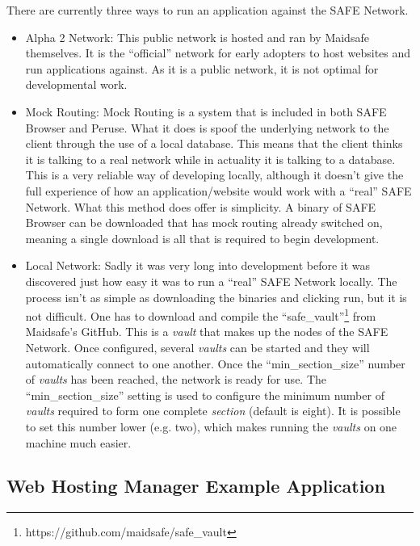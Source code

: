 There are currently three ways to run an application against the SAFE Network.
\begin{itemize}
	\item Alpha 2 Network: This public network is hosted and ran by Maidsafe themselves. It is the ``official'' network for early adopters to host websites and run applications against. As it is a public network, it is not optimal for developmental work.
	\item Mock Routing: Mock Routing is a system that is included in both SAFE Browser and Peruse. What it does is spoof the underlying network to the client through the use of a local database. This means that the client thinks it is talking to a real network while in actuality it is talking to a database. This is a very reliable way of developing locally, although it doesn't give the full experience of how an application/website would work with a ``real'' SAFE Network. What this method does offer is simplicity. A binary of SAFE Browser can be downloaded that has mock routing already switched on, meaning a single download is all that is required to begin development.
	\item Local Network: Sadly it was very long into development before it was discovered just how easy it was to run a ``real'' SAFE Network locally. The process isn't as simple as downloading the binaries and clicking run, but it is not difficult. One has to download and compile the ``safe\_vault''\footnote{https://github.com/maidsafe/safe\_vault} from Maidsafe's GitHub. This is a \textit{vault} that makes up the nodes of the SAFE Network. Once configured, several \textit{vaults} can be started and they will automatically connect to one another. Once the ``min\_section\_size'' number of \textit{vaults} has been reached, the network is ready for use. The ``min\_section\_size'' setting is used to configure the minimum number of \textit{vaults} required to form one complete \textit{section} (default is eight). It is possible to set this number lower (e.g. two), which makes running the \textit{vaults} on one machine much easier.
\end{itemize}

\subsection{Web Hosting Manager Example Application}

